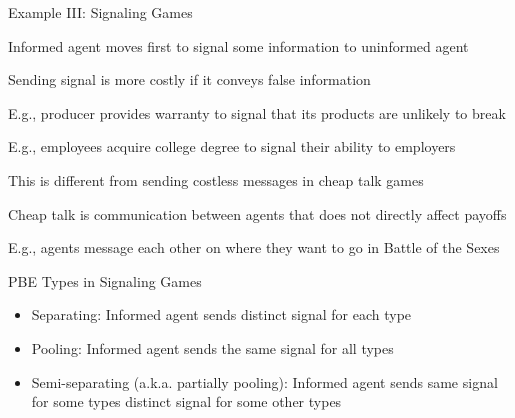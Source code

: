 \documentclass[11pt,aspectratio=169,handout]{beamer}
\begin{document}
  
  \begin{frame}{Example III: Signaling Games}
     \begin{itemizes}
      \item \alert{Informed} agent moves first to \alert{signal} some information to uninformed agent
      \item Sending signal is more costly if it conveys false information
      \item E.g., producer provides warranty to signal that its products are unlikely to break
      \item E.g., employees acquire college degree to signal their ability to employers
      \item This is different from sending costless \alert{messages} in \alert{cheap talk} games
      \item Cheap talk is communication between agents that does not directly affect payoffs
      \item E.g., agents message each other on where they want to go in  Battle of the Sexes
     \end{itemizes}
  \end{frame}
  
  
  \begin{frame}{PBE Types in Signaling Games}
   \begin{itemize}[<+->]
   \setlength{\itemsep}{1em}
    \item \alert{Separating}: Informed agent sends distinct signal for each type
    \item \alert{Pooling}: Informed agent sends the same signal for all types
    \item \alert{Semi-separating} (a.k.a. partially pooling): Informed agent sends same signal for some types distinct signal for some other types
   \end{itemize}
  \end{frame}
  
\end{document}

